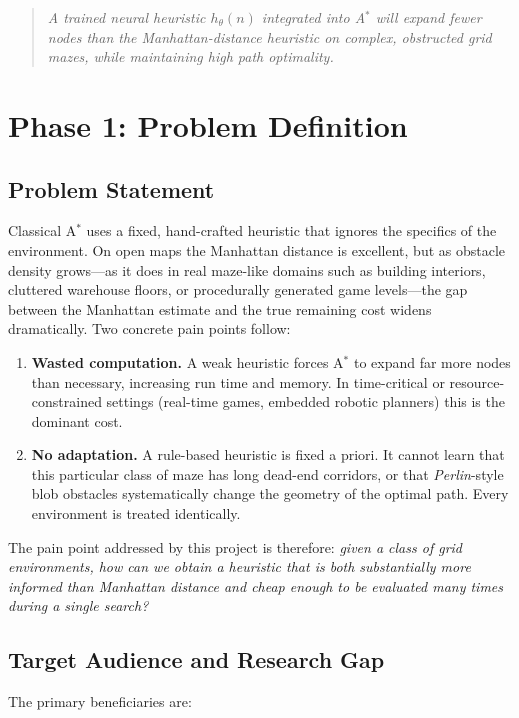 \documentclass[11pt]{article}
\begin{document}
\begin{quote}
\itshape
A trained neural heuristic $h_\theta(n)$ integrated into A$^\ast$ will expand fewer
nodes than the Manhattan-distance heuristic on complex, obstructed grid mazes, while
maintaining high path optimality.
\end{quote}

\section{Phase 1: Problem Definition}

\subsection{Problem Statement}
Classical A$^\ast$ uses a fixed, hand-crafted heuristic that ignores the specifics of the
environment. On open maps the Manhattan distance is excellent, but as obstacle density
grows---as it does in real maze-like domains such as building interiors, cluttered
warehouse floors, or procedurally generated game levels---the gap between the Manhattan
estimate and the true remaining cost widens dramatically. Two concrete pain points
follow:

\begin{enumerate}
  \item \textbf{Wasted computation.} A weak heuristic forces A$^\ast$ to expand far more
  nodes than necessary, increasing run time and memory. In time-critical or
  resource-constrained settings (real-time games, embedded robotic planners) this is the
  dominant cost.
  \item \textbf{No adaptation.} A rule-based heuristic is fixed a priori. It cannot learn
  that this particular class of maze has long dead-end corridors, or that
  \emph{Perlin}-style blob obstacles systematically change the geometry of the optimal
  path. Every environment is treated identically.
\end{enumerate}

The pain point addressed by this project is therefore: \emph{given a class of grid
environments, how can we obtain a heuristic that is both substantially more informed
than Manhattan distance and cheap enough to be evaluated many times during a single
search?}

\subsection{Target Audience and Research Gap}
The primary beneficiaries are:
\end{document}
